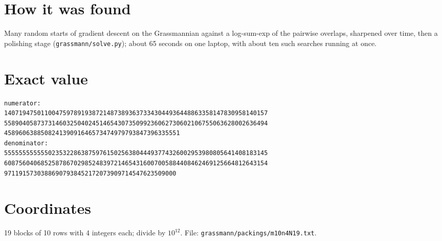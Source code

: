 \documentclass[11pt,a4paper]{article}
\begin{document}
\section{How it was found}
Many random starts of gradient descent on the Grassmannian against a log-sum-exp of the pairwise overlaps, sharpened over time, then a polishing stage (\texttt{grassmann/solve.py}); about 65 seconds on one laptop, with about ten such searches running at once.


\appendix
\section{Exact value}
{\small
\begin{verbatim}
numerator:
140719475011004759789193872148738936373343044936448863358147830958140157
558904058737314603250402451465430735099236062730602106755063628002636494
458960638850824139091646573474979793847396335551
denominator:
555555555555023532286387597615025638044493774326002953980805641408183145
608756040685258786702985248397214654316007005884408462469125664812643154
97119157303886907938452172073909714547623509000
\end{verbatim}}

\section{Coordinates}
19 blocks of 10 rows with 4 integers each; divide by $10^{12}$. File: \texttt{grassmann/packings/m10n4N19.txt}.
{\tiny
\begin{multicols}{3}
\end{multicols}}
\end{document}

